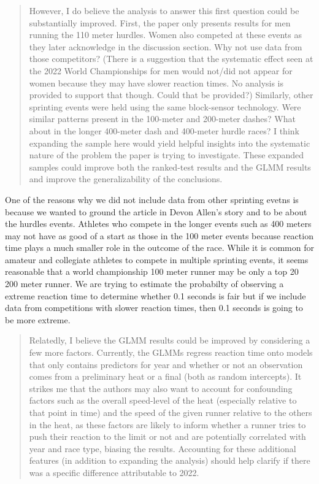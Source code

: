 \documentclass[12pt]{article}
\newenvironment{comment}%
{\begin{quotation}\noindent\small\it\color{darkblue}\ignorespaces%
}{\end{quotation}}
\begin{document}
\begin{comment}
However, I do believe the analysis to answer this first question could be
substantially improved. First, the paper only presents results for men running
the 110 meter hurdles. Women also competed at these events as they later
acknowledge in the discussion section. Why not use data from those competitors?
(There is a suggestion that the systematic effect seen at the 2022 World
Championships for men would not/did not appear for women because they may have
slower reaction times. No analysis is provided to support that though. Could
that be provided?) Similarly, other sprinting events were held using the same
block-sensor technology. Were similar patterns present in the 100-meter and
200-meter dashes? What about in the longer 400-meter dash and 400-meter hurdle
races? I think expanding the sample here would yield helpful insights into the
systematic nature of the problem the paper is trying to investigate. These
expanded samples could improve both the ranked-test results and the GLMM results
and improve the generalizability of the conclusions.
\end{comment}


One of the reasons why we did not include data from other sprinting evetns is
because we wanted to ground the article in Devon Allen's story and to be about
the hurdles events.  Athletes who compete in the longer events such as 400 meters
may not have as good of a start as those in the 100 meter events because reaction
time plays a much smaller role in the outcome of the race. While it is common
for amateur and collegiate athletes to compete in multiple sprinting events, it
seems reasonable that a world championship 100 meter runner may be only a top 20
200 meter runner.  We are trying to estimate the probabilty of observing a extreme
reaction time to determine whether 0.1 seconds is fair but if we include data
from competitions with slower reaction times, then 0.1 seconds is going to be
more extreme.


\begin{comment}
Relatedly, I believe the GLMM results could be improved by considering a few
more factors. Currently, the GLMMs regress reaction time onto models that only
contains predictors for year and whether or not an observation comes from a
preliminary heat or a final (both as random intercepts). It strikes me that the
authors may also want to account for confounding factors such as the overall
speed-level of the heat (especially relative to that point in time) and the
speed of the given runner relative to the others in the heat, as these factors
are likely to inform whether a runner tries to push their reaction to the limit
or not and are potentially correlated with year and race type, biasing the
results. Accounting for these additional features (in addition to expanding the
analysis) should help clarify if there was a specific difference attributable to
2022.
\end{comment} 
\end{document}
